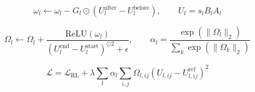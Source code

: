 \begin{equation}
  \omega_l \leftarrow \omega_l - G_l \odot \left(U_l^{\mathrm{after}} - U_l^{\mathrm{before}}\right),\qquad U_l = s_l B_l A_l
  \label{eq:eq_hlora_path}
\end{equation}

\begin{equation}
  \Omega_l \leftarrow \Omega_l + \frac{\mathrm{ReLU}\left(\omega_l\right)}{\left(U_l^{\mathrm{end}} - U_l^{\mathrm{start}}\right)^{\odot 2} + \epsilon},\qquad \alpha_l = \frac{\exp\left(\|\Omega_l\|_2\right)}{\sum_{k}\exp\left(\|\Omega_k\|_2\right)}
  \label{eq:eq_hlora_omega}
\end{equation}

\begin{equation}
  \mathcal{L} = \mathcal{L}_{\mathrm{RL}} + \lambda\sum_{l}\alpha_l\sum_{i,j}\Omega_{l,ij}\left(U_{l,ij} - U^{\mathrm{ref}}_{l,ij}\right)^2
  \label{eq:eq_hlora_loss}
\end{equation}
